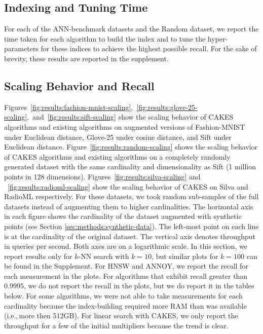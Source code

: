 \subsection{Indexing and Tuning Time}
\label{sec:results:indexing-and-tuning-time}

For each of the ANN-benchmark datasets and the Random dataset, we report the time taken for each algorithm to build the index and to tune the hyper-parameters for these indices to achieve the highest possible recall. For the sake of brevity, these results are reported in the supplement.


\subsection{Scaling Behavior and Recall}
\label{sec:results:scaling-behavior-and-recall}

Figures~\ref{fig:results:fashion-mnist-scaling},~\ref{fig:results:glove-25-scaling},~and~\ref{fig:results:sift-scaling} show the scaling behavior of CAKES algorithms and existing algorithms on augmented versions of Fashion-MNIST under Euclidean distance,
Glove-25 under cosine distance, and
Sift under Euclidean distance.
Figure~\ref{fig:results:random-scaling} shows the scaling behavior of CAKES algorithms and existing algorithms on a completely randomly generated dataset with the same cardinality and dimensionality as Sift (1 million points in 128 dimensions).
Figures~\ref{fig:results:silva-scaling} and ~\ref{fig:results:radioml-scaling} show the scaling behavior of CAKES on Silva and RadioML respectively.
For these datasets, we took random sub-samples of the full datasets instead of augmenting them to higher cardinalities.
The horizontal axis in each figure shows the cardinality of the dataset augmented with synthetic points (see Section \ref{sec:methods:synthetic-data}).
The left-most point on each line is at the cardinality of the original dataset.
The vertical axis denotes throughput in queries per second.
Both axes are on a logarithmic scale.
In this section, we report results only for $k$-NN search with $k = 10$, but similar plots for $k = 100$ can be found in the Supplement.
For HNSW and ANNOY, we report the recall for each measurement in the plots. For algorithms that exhibit recall greater than $0.9995$, we do not report the recall in the plots, but we do report it in the tables below.
For some algorithms, we were not able to take measurements for each cardinality because the index-building required more RAM than was available (i.e.,\,more then 512GB).
For linear search with CAKES, we only report the throughput for a few of the initial multipliers because the trend is clear.

